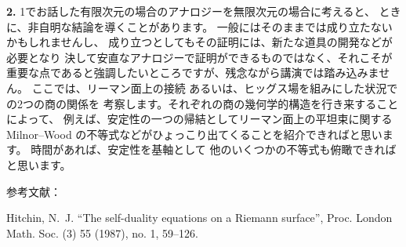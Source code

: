 \documentclass[uplatex,dvipdfmx]{jlreq}
\begin{document}
\noindent
\textbf{2.}
1でお話した有限次元の場合のアナロジーを無限次元の場合に考えると、
ときに、非自明な結論を導くことがあります。
一般にはそのままでは成り立たないかもしれませんし、
成り立つとしてもその証明には、新たな道具の開発などが必要となり
決して安直なアナロジーで証明ができるものではなく、それこそが
重要な点であると強調したいところですが、残念ながら講演では踏み込みません。
ここでは、リーマン面上の接続
あるいは、ヒッグス場を組みにした状況での2つの商の関係を
考察します。それぞれの商の幾何学的構造を行き来することによって、
例えば、安定性の一つの帰結としてリーマン面上の平坦束に関する
Milnor--Wood の不等式などがひょっこり出てくることを紹介できればと思います。
時間があれば、安定性を基軸として
他のいくつかの不等式も俯瞰できればと思います。
\vspace{6pt}

\noindent
参考文献：

\noindent
Hitchin, N.~J.
``The self-duality equations on a Riemann surface'',
Proc. London Math. Soc. (3) 55 (1987), no. 1, 59--126.
\end{document}
